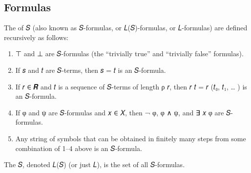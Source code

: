 \documentclass[a4paper,UKenglish,cleveref,autoref,thm-restate,12pt]{lipics-v2021-wjd}
\newcommand{\<}{\langle}
\renewcommand{\>}{\rangle}
\begin{document}
\subsection{Formulas}\label{formulas}
The  of 𝑆 (also known as 𝑆-formulas, or 𝐿(𝑆)-formulas, or 𝐿-formulas) are defined recursively as follows:
\begin{enumerate}
\item ⊤ and ⊥ are 𝑆-formulas (the ``trivially true'' and ``trivially false'' formulas).
\item If 𝑠 and 𝑡 are 𝑆-terms, then 𝑠 = 𝑡 is an 𝑆-formula.
\item If 𝑟 ∈ 𝑹 and 𝑡 is a sequence of 𝑆-terms of length ρ 𝑟, then
      𝑟 𝑡 = 𝑟 (𝑡₀, 𝑡₁, … ) is an 𝑆-formula.
\item If φ and ψ are 𝑆-formulas and 𝑥 ∈ 𝑋, then ¬ φ, φ ∧ ψ, and ∃ 𝑥 φ are 𝑆-formulas.
\item Any string of symbols that can be obtained in finitely many steps
      from some combination of 1--4 above is an 𝑆-formula.
\end{enumerate}
The  𝑆, denoted 𝐿(𝑆) (or just 𝐿), is the set of all 𝑆-formulas.
\end{document}
